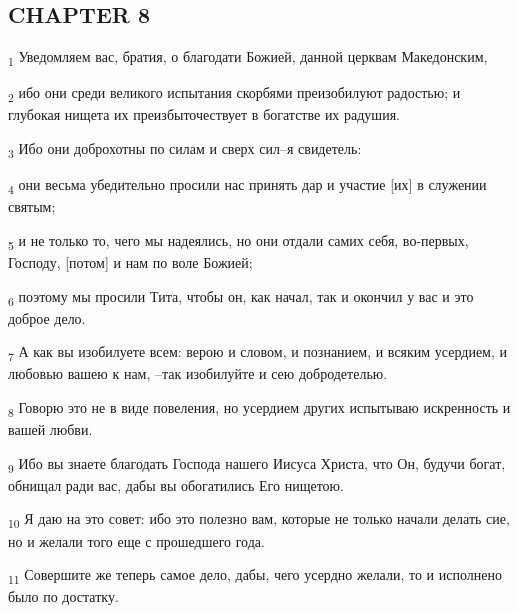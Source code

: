 \subsection{CHAPTER 8}
\begin{tcolorbox}
\textsubscript{1} Уведомляем вас, братия, о благодати Божией, данной церквам Македонским,
\end{tcolorbox}
\begin{tcolorbox}
\textsubscript{2} ибо они среди великого испытания скорбями преизобилуют радостью; и глубокая нищета их преизбыточествует в богатстве их радушия.
\end{tcolorbox}
\begin{tcolorbox}
\textsubscript{3} Ибо они доброхотны по силам и сверх сил--я свидетель:
\end{tcolorbox}
\begin{tcolorbox}
\textsubscript{4} они весьма убедительно просили нас принять дар и участие [их] в служении святым;
\end{tcolorbox}
\begin{tcolorbox}
\textsubscript{5} и не только то, чего мы надеялись, но они отдали самих себя, во-первых, Господу, [потом] и нам по воле Божией;
\end{tcolorbox}
\begin{tcolorbox}
\textsubscript{6} поэтому мы просили Тита, чтобы он, как начал, так и окончил у вас и это доброе дело.
\end{tcolorbox}
\begin{tcolorbox}
\textsubscript{7} А как вы изобилуете всем: верою и словом, и познанием, и всяким усердием, и любовью вашею к нам, --так изобилуйте и сею добродетелью.
\end{tcolorbox}
\begin{tcolorbox}
\textsubscript{8} Говорю это не в виде повеления, но усердием других испытываю искренность и вашей любви.
\end{tcolorbox}
\begin{tcolorbox}
\textsubscript{9} Ибо вы знаете благодать Господа нашего Иисуса Христа, что Он, будучи богат, обнищал ради вас, дабы вы обогатились Его нищетою.
\end{tcolorbox}
\begin{tcolorbox}
\textsubscript{10} Я даю на это совет: ибо это полезно вам, которые не только начали делать сие, но и желали того еще с прошедшего года.
\end{tcolorbox}
\begin{tcolorbox}
\textsubscript{11} Совершите же теперь самое дело, дабы, чего усердно желали, то и исполнено было по достатку.
\end{tcolorbox}
